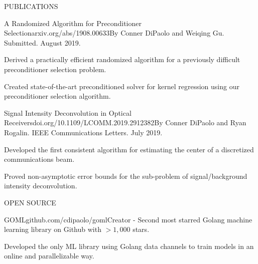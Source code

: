\documentclass{resume} %
\begin{document}

\begin{rSection}{PUBLICATIONS}

\begin{rSubsection}{A Randomized Algorithm for Preconditioner Selection}{\textsf{arxiv.org/abs/1908.00633}}{By Conner DiPaolo and Weiqing Gu. Submitted. August 2019.}

\item Derived a practically efficient randomized algorithm for a previously difficult preconditioner selection problem.
\item Created state-of-the-art preconditioned solver for kernel regression using our preconditioner selection algorithm.
\end{rSubsection}

\begin{rSubsection}{Signal Intensity Deconvolution in Optical Receivers}{\textsf{doi.org/10.1109/LCOMM.2019.2912382}}{By Conner DiPaolo and Ryan Rogalin. IEEE Communications Letters. July 2019.}

\item Developed the first consistent algorithm for estimating the center of a discretized communications beam.
\item Proved non-asymptotic error bounds for the sub-problem of signal/background intensity deconvolution.
\end{rSubsection}


\end{rSection}


\begin{rSection}{OPEN SOURCE}

\begin{rSubsection}{GOML}{\textsf{github.com/cdipaolo/goml}}{Creator - Second most starred Golang machine learning library on Github with $> 1,000$ stars.}

\item Developed the only ML library using Golang data channels to train models in an online and parallelizable way.
\end{rSubsection}

\end{rSection}
\end{document}
